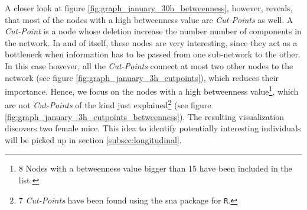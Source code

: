 A closer look at figure \ref{fig:graph_january_30h_betweenness}, however, reveals, that most of the nodes with a high betweenness value are \textit{Cut-Points} as well. A \textit{Cut-Point} is a node whose deletion increase the number number of components in the network\cite{pajek:03}. In and of itself, these nodes are very interesting, since they act as a bottleneck when information has to be passed from one sub-network to the other. In this case however, all the \textit{Cut-Points} connect at most two other nodes to the network (see figure \ref{fig:graph_january_3h_cutpoints}), which reduces their importance. Hence, we focus on the nodes with a high betweenness value\footnote{8 Nodes with a betweenness value bigger than 15 have been included in the list.}, which are not \textit{Cut-Points} of the kind just explained\footnote{7 \textit{Cut-Points} have been found using the sna\cite{sna:09} package for \lstinline|R|.} (see figure \ref{fig:graph_january_3h_cutpoints_betweenness}). The resulting visualization discovers two female mice. This idea to identify potentially interesting individuals will be picked up in section \ref{subsec:longitudinal}. 

